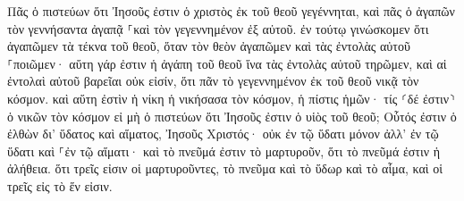 \documentclass{openreader}
\begin{document}
Πᾶς ὁ πιστεύων ὅτι Ἰησοῦς ἐστιν ὁ χριστὸς ἐκ τοῦ θεοῦ γεγέννηται, καὶ πᾶς ὁ ἀγαπῶν τὸν γεννήσαντα ἀγαπᾷ ⸀καὶ τὸν γεγεννημένον ἐξ αὐτοῦ. ἐν τούτῳ γινώσκομεν ὅτι ἀγαπῶμεν τὰ τέκνα τοῦ θεοῦ, ὅταν τὸν θεὸν ἀγαπῶμεν καὶ τὰς ἐντολὰς αὐτοῦ ⸀ποιῶμεν· αὕτη γάρ ἐστιν ἡ ἀγάπη τοῦ θεοῦ ἵνα τὰς ἐντολὰς αὐτοῦ τηρῶμεν, καὶ αἱ ἐντολαὶ αὐτοῦ βαρεῖαι οὐκ εἰσίν, ὅτι πᾶν τὸ γεγεννημένον ἐκ τοῦ θεοῦ νικᾷ τὸν κόσμον. καὶ αὕτη ἐστὶν ἡ νίκη ἡ νικήσασα τὸν κόσμον, ἡ πίστις ἡμῶν· τίς ⸂δέ ἐστιν⸃ ὁ νικῶν τὸν κόσμον εἰ μὴ ὁ πιστεύων ὅτι Ἰησοῦς ἐστιν ὁ υἱὸς τοῦ θεοῦ; Οὗτός ἐστιν ὁ ἐλθὼν δι’ ὕδατος καὶ αἵματος, Ἰησοῦς Χριστός· οὐκ ἐν τῷ ὕδατι μόνον ἀλλ’ ἐν τῷ ὕδατι καὶ ⸀ἐν τῷ αἵματι· καὶ τὸ πνεῦμά ἐστιν τὸ μαρτυροῦν, ὅτι τὸ πνεῦμά ἐστιν ἡ ἀλήθεια. ὅτι τρεῖς εἰσιν οἱ μαρτυροῦντες, τὸ πνεῦμα καὶ τὸ ὕδωρ καὶ τὸ αἷμα, καὶ οἱ τρεῖς εἰς τὸ ἕν εἰσιν. 
\end{document}
